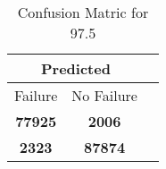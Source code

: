 \begin{table}[] 
\label{Table: Prediction Accuracy-DMD97.5OnlySunEKF-ignoreReflection-Reflection} 
\caption{Confusion Matric for 97.5} 
\centering 
\begin{tabular} 
 {@{}ccc@{}} 
\toprule 
\multicolumn{2}{c}{\textbf{Predicted}}
 \\ \midrule 
\multicolumn{1}{|c|}{Failure} & 
\multicolumn{1}{c|}{No Failure}
 \\ \midrule 
\multicolumn{1}{|c|}{\color{green}\textbf{77925}} & 
\multicolumn{1}{c|}{\color{red}\textbf{2006}}
 \\ \midrule 
\multicolumn{1}{|c|}{\color{red}\textbf{2323}} & 
\multicolumn{1}{c|}{\color{green}\textbf{87874}}
 \\ \bottomrule 
\end{tabular} 
\end{table} 
